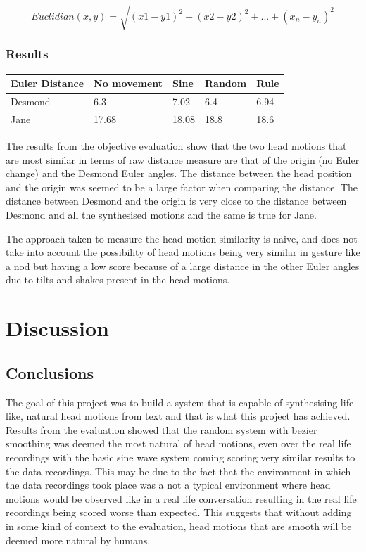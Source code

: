 \documentclass[bsc,frontabs,twoside,singlespacing,parskip]{infthesis}
\begin{document}
$$ Euclidian(x,y) = \sqrt{(x1 - y1)^2 + (x2 - y2)^2 + ... + (x_n - y_n)^2}$$

\subsection{Results}

\begin{table}[h]
\begin{tabular}{lllll}
\hline
Euler Distance & No movement & Sine  & Random & Rule   \\ \hline
Desmond        & 6.3    & 7.02  & 6.4    & 6.94   \\
Jane           & 17.68  & 18.08 & 18.8   & 18.6 \\ \hline
\end{tabular}
\end{table}

The results from the objective evaluation show that the two head motions that are most similar in terms of raw distance measure are that of the origin (no Euler change) and the Desmond Euler angles. The distance between the head position and the origin was seemed to be a large factor when comparing the distance. The distance between Desmond and the origin is very close to the distance between Desmond and all the synthesised motions and the same is true for Jane. 

The approach taken to measure the head motion similarity is naive, and does not take into account the possibility of head motions being very similar in gesture like a nod but having a low score because of a large distance in the other Euler angles due to tilts and shakes present in the head motions.



\chapter{Discussion}

\section{Conclusions}

The goal of this project was to build a system that is capable of synthesising life-like, natural head motions from text and that is what this project has achieved. Results from the evaluation showed that the random system with bezier smoothing was deemed the most natural of head motions, even over the real life recordings with the basic sine wave system coming scoring very similar results to the data recordings. This may be due to the fact that the environment in which the data recordings took place was a not a typical environment where head motions would be observed like in a real life conversation resulting in the real life recordings being scored worse than expected. This suggests that without adding in some kind of context to the evaluation, head motions that are smooth will be deemed more natural by humans. 
\end{document}
